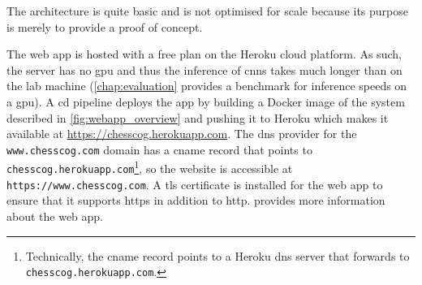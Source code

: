 \documentclass[../main.tex]{subfiles}
\begin{document}
The architecture is quite basic and is not optimised for scale because its purpose is merely to provide a proof of concept.

The web app is hosted with a free plan on the Heroku cloud platform.
As such, the server has no \gls{gpu} and thus the inference of \glspl{cnn} takes much longer than on the lab machine (\cref{chap:evaluation} provides a benchmark for inference speeds on a \gls{gpu}).
A \gls{cd} pipeline deploys the app by building a Docker image of the system described in \cref{fig:webapp_overview} and pushing it to Heroku which makes it available at \url{https://chesscog.herokuapp.com}.
The \gls{dns} provider for the \texttt{www.chesscog.com} domain has a \gls{cname} record that points to \texttt{chesscog.herokuapp.com}\footnote{Technically, the \gls{cname} record points to a Heroku \gls{dns} server that forwards to \texttt{chesscog.herokuapp.com}.}, so the website is accessible at \texttt{https://www.chesscog.com}.
A \gls{tls} certificate is installed for the web app to ensure that it supports \gls{https} in addition to \gls{http}.
 provides more information about the web app.
\end{document}
